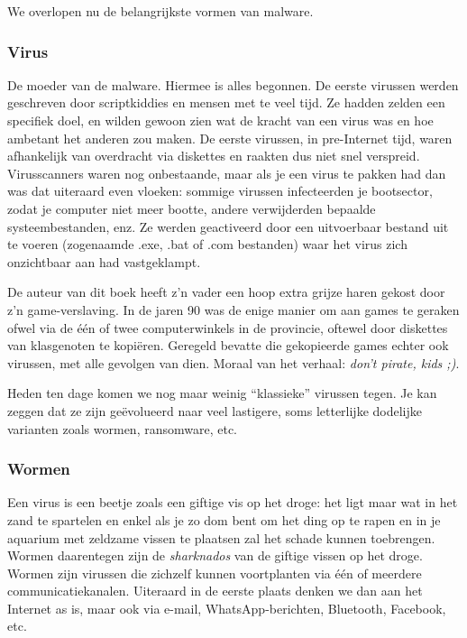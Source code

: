 \documentclass[
  10pt,
  dutch,
  paper=a4,
  ,captions=tableheading
]{scrbook}
\begin{document}
We overlopen nu de belangrijkste vormen van malware.

\subsubsection{Virus}\label{virus}

De moeder van de malware. Hiermee is alles begonnen. De eerste virussen
werden geschreven door scriptkiddies en mensen met te veel tijd. Ze
hadden zelden een specifiek doel, en wilden gewoon zien wat de kracht
van een virus was en hoe ambetant het anderen zou maken. De eerste
virussen, in pre-Internet tijd, waren afhankelijk van overdracht via
diskettes en raakten dus niet snel verspreid. Virusscanners waren nog
onbestaande, maar als je een virus te pakken had dan was dat uiteraard
even vloeken: sommige virussen infecteerden je bootsector, zodat je
computer niet meer bootte, andere verwijderden bepaalde
systeembestanden, enz. Ze werden geactiveerd door een uitvoerbaar
bestand uit te voeren (zogenaamde .exe, .bat of .com bestanden) waar het
virus zich onzichtbaar aan had vastgeklampt.

\begin{tipblock}
De auteur van dit boek heeft z'n vader een hoop extra grijze haren
gekost door z'n game-verslaving. In de jaren 90 was de enige manier om
aan games te geraken ofwel via de één of twee computerwinkels in de
provincie, oftewel door diskettes van klasgenoten te kopiëren. Geregeld
bevatte die gekopieerde games echter ook virussen, met alle gevolgen van
dien. Moraal van het verhaal: \emph{don't pirate, kids ;)}.
\end{tipblock}

Heden ten dage komen we nog maar weinig ``klassieke'' virussen tegen. Je
kan zeggen dat ze zijn geëvolueerd naar veel lastigere, soms letterlijke
dodelijke varianten zoals wormen, ransomware, etc.

\subsubsection{Wormen}\label{wormen}

Een virus is een beetje zoals een giftige vis op het droge: het ligt
maar wat in het zand te spartelen en enkel als je zo dom bent om het
ding op te rapen en in je aquarium met zeldzame vissen te plaatsen zal
het schade kunnen toebrengen. Wormen daarentegen zijn de
\emph{sharknados} van de giftige vissen op het droge. Wormen zijn
virussen die zichzelf kunnen voortplanten via één of meerdere
communicatiekanalen. Uiteraard in de eerste plaats denken we dan aan het
Internet as is, maar ook via e-mail, WhatsApp-berichten, Bluetooth,
Facebook, etc.
\end{document}
